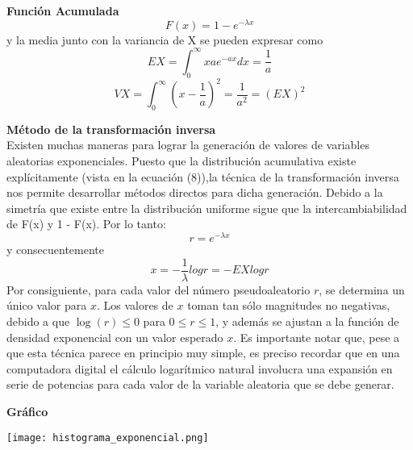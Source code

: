 \documentclass[11pt]{article}
\begin{document}
\noindent\textbf{Función Acumulada}\\
\[
F(x) = 1 - e^{-\lambda x}
\]
y la media junto con la variancia de X se pueden expresar como
  \begin{equation}
    EX = \int_{0}^{\infty} xae^{-ax}dx = \frac{1}{a}
  \end{equation}
  \begin{equation}
  VX = \int_{0}^{\infty} (x-\frac{1}{a})^2 = \frac{1}{a^2} = (EX)^2
\end{equation}
  
\noindent\textbf{Método de la transformación inversa}\\

Existen muchas maneras para lograr la generación de valores de variables aleatorias exponenciales. Puesto que la distribución acumulativa existe explícitamente (vista en la ecuación (8)),la técnica de la transformación inversa nos permite desarrollar métodos directos para dicha generación.
Debido a la simetría que existe entre la distribución uniforme sigue que la intercambiabilidad de F(x) y 1 - F(x). Por lo tanto:
\begin{equation}
r = e^{-\lambda x}
\end{equation}
y consecuentemente
\begin{equation}
x = -\frac{1}{\lambda}log r  = - EXlog r
\end{equation}
Por consiguiente, para cada valor del número pseudoaleatorio \( r \), se determina un único valor para \( x \). Los valores de \( x \) toman tan sólo magnitudes no negativas, debido a que \( \log(r) \leq 0 \) para \( 0 \leq r \leq 1 \), y además se ajustan a la función de densidad exponencial con un valor esperado \( x \). Es importante notar que, pese a que esta técnica parece en principio muy simple, es preciso recordar que en una computadora digital el cálculo logarítmico natural involucra una expansión en serie de potencias para cada valor de la variable aleatoria que se debe generar.

\newpage
\noindent\textbf{Gráfico}

\begin{center}
\texttt{[image: histograma\_exponencial.png]}
\end{center}
\end{document}

